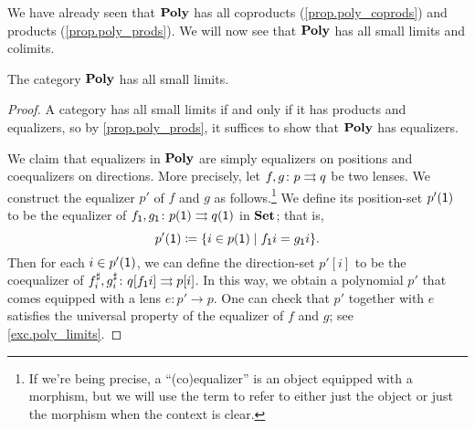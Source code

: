 \documentclass[Book-Poly]{subfiles}
\begin{document}
We have already seen that $\mathbf{Poly}$ has all coproducts (\cref{prop.poly_coprods}) and products (\cref{prop.poly_prods}).
We will now see that $\mathbf{Poly}$ has all small limits and colimits.

\begin{theorem}\label{thm.poly_limits}
The category $\mathbf{Poly}$ has all small limits.
\end{theorem}
\begin{proof}
A category has all small limits if and only if it has products and equalizers, so by \cref{prop.poly_prods}, it suffices to show that $\mathbf{Poly}$ has equalizers.

We claim that equalizers in $\mathbf{Poly}$ are simply equalizers on positions and coequalizers on directions.
More precisely, let $f,g \colon p \rightrightarrows q$ be two lenses.
We construct the equalizer $p'$ of $f$ and $g$ as follows.\footnote{If we're being precise, a ``(co)equalizer'' is an object equipped with a morphism, but we will use the term to refer to either just the object or just the morphism when the context is clear.}
We define its position-set $p'(\textsf{1})$ to be the equalizer of $f_{\textsf{1}},g_{\textsf{1}} \colon p(\textsf{1}) \rightrightarrows q(\textsf{1})$ in $\mathbf{Set}$; that is,
\[
    p'(\textsf{1}) \coloneqq \{i \in p(\textsf{1}) \mid f_{\textsf{1}}i = g_{\textsf{1}}i\}.
\]
Then for each $i \in p'(\textsf{1})$, we can define the direction-set $p'[i]$ to be the coequalizer of $f^\sharp_i, g^\sharp_i \colon q[f_{\textsf{1}}i] \rightrightarrows p[i]$.
In this way, we obtain a polynomial $p'$ that comes equipped with a lens $e \colon p' \to p$.
One can check that $p'$ together with $e$ satisfies the universal property of the equalizer of $f$ and $g$; see \cref{exc.poly_limits}.
\end{proof}
\end{document}
